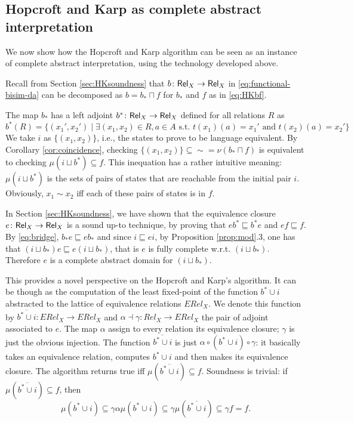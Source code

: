 \documentclass{llncs}
\begin{document}
\subsection{Hopcroft and Karp as complete abstract interpretation}
We now show how the Hopcroft and Karp algorithm can be seen as an instance of complete abstract interpretation, using the technology developed above.

Recall from Section \ref{sec:HKsoundness} that $b\colon \mathsf{Rel}_X\to \mathsf{Rel}_X$ in \eqref{eq:functional-bisim-da} can be decomposed as
$b = b_* \sqcap f$ for $b_*$ and $f$ as in \eqref{eq:HKbf}.

The map $b_*$ has a left adjoint $b^*\colon \mathsf{Rel}_X \to \mathsf{Rel}_X$ defined for all relations $R$ as
\begin{equation}\label{eq:bstarDA}
b^*(R) = \{(x_1',x_2') \mid \exists (x_1,x_2)\in R, a\in A \text{ s.t. }  t(x_1)(a)=x_1' \text{ and } t(x_2)(a)=x_2' \}
\end{equation}
We take $i$ as $\{(x_1,x_2)\}$, i.e., the states to prove to be language equivalent. By Corollary \ref{cor:coincidence}, checking $\{(x_1,x_2)\} \subseteq \sim = \nu (b_* \sqcap f)$ is equivalent to checking $\mu(i\sqcup b^*) \subseteq f$. This inequation has a rather intuitive meaning: $\mu(i\sqcup b^*)$ is the sets of pairs of states that are reachable from the initial pair $i$. Obviously, $x_1 \sim x_2$ iff each of these pairs of states is in $f$.


In Section \ref{sec:HKsoundness}, we have shown that the equivalence closure $e\colon \mathsf{Rel}_X \to \mathsf{Rel}_X$ is a sound up-to technique, by proving that $eb^* \sqsubseteq b^*e$ and $ef\sqsubseteq f$. By \eqref{eq:bridge}, $b_*e \sqsubseteq eb_*$ and since $i\sqsubseteq ei$, by Proposition \ref{prop:mod}.3, one has that $(i \sqcup b_*)e \sqsubseteq e(i \sqcup b_*)$, that is $e$ is fully complete w.r.t. $(i \sqcup b_*)$. Therefore $e$ is a complete abstract domain for  $(i \sqcup b_*)$.

\medskip

This provides a novel perspective on the Hopcroft and Karp's algorithm. It can be though as the computation of the least fixed-point  of the function $b^*\cup i$ abstracted to the lattice of equivalence relations $ERel_X$. We denote this function by $\overline{b^*\cup i}\colon ERel_X \to ERel_X$ and $\alpha \dashv \gamma \colon Rel_X \to ERel_X$ the pair of adjoint associated to $e$. The map $\alpha$ assign to every relation its equivalence closure; $\gamma$ is just the obvious injection. The function $\overline{b^*\cup i}$ is just $\alpha \circ (b^*\cup i) \circ \gamma$: it basically takes an equivalence relation, computes $b^*\cup i$ and then makes its equivalence closure. The algorithm returns true iff $\mu (\overline{b^*\cup i}) \subseteq f$. Soundness is trivial: if $\mu (\overline{b^*\cup i})  \subseteq f$, then $$\mu (b^*\cup i) \subseteq \gamma \alpha \mu (b^*\cup i) \subseteq \gamma \mu (\overline{b^*\cup i}) \subseteq \gamma  f =f\text{.}$$
\end{document}
